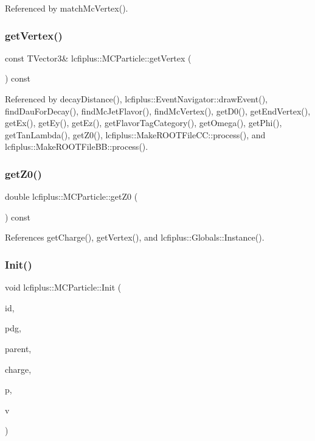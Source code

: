 Referenced by match\+Mc\+Vertex().

\mbox{\label{classlcfiplus_1_1MCParticle_a489f84fb624a3bfbe0bc17af678ccce4}} 
\subsubsection{get\+Vertex()}
{\footnotesize\ttfamily const T\+Vector3\& lcfiplus\+::\+M\+C\+Particle\+::get\+Vertex (\begin{DoxyParamCaption}{ }\end{DoxyParamCaption}) const\hspace{0.3cm}{\ttfamily [inline]}}



Referenced by decay\+Distance(), lcfiplus\+::\+Event\+Navigator\+::draw\+Event(), find\+Dau\+For\+Decay(), find\+Mc\+Jet\+Flavor(), find\+Mc\+Vertex(), get\+D0(), get\+End\+Vertex(), get\+Ex(), get\+Ey(), get\+Ez(), get\+Flavor\+Tag\+Category(), get\+Omega(), get\+Phi(), get\+Tan\+Lambda(), get\+Z0(), lcfiplus\+::\+Make\+R\+O\+O\+T\+File\+C\+C\+::process(), and lcfiplus\+::\+Make\+R\+O\+O\+T\+File\+B\+B\+::process().

\mbox{\label{classlcfiplus_1_1MCParticle_a6d6a1ceeaca055916196b151a36a1b88}} 
\subsubsection{get\+Z0()}
{\footnotesize\ttfamily double lcfiplus\+::\+M\+C\+Particle\+::get\+Z0 (\begin{DoxyParamCaption}{ }\end{DoxyParamCaption}) const}



References get\+Charge(), get\+Vertex(), and lcfiplus\+::\+Globals\+::\+Instance().

\mbox{\label{classlcfiplus_1_1MCParticle_a625da26849a99e4bb245330fcbd521b2}} 
\subsubsection{Init()}
{\footnotesize\ttfamily void lcfiplus\+::\+M\+C\+Particle\+::\+Init (\begin{DoxyParamCaption}\item[{int}]{id,  }\item[{int}]{pdg,  }\item[{\textbf{ M\+C\+Particle} $\ast$}]{parent,  }\item[{double}]{charge,  }\item[{const T\+Lorentz\+Vector \&}]{p,  }\item[{const T\+Vector3 \&}]{v }\end{DoxyParamCaption})}



